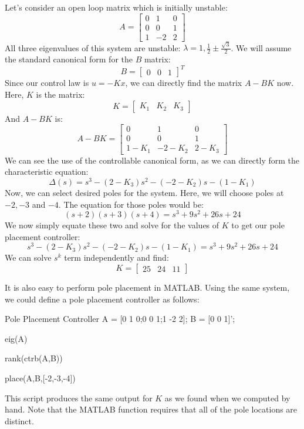 \newpage
\begin{example}
Let's consider an open loop matrix which is initially unstable:
$$A=\begin{bmatrix}
0&1&0   \\0&0&1\\1&-2&2
\end{bmatrix}$$
All three eigenvalues of this system are unstable: $\lambda=1,\frac{1}{2}\pm\frac{\sqrt 3}{2}$. We will assume the standard canonical form for the $B$ matrix:
$$B=\begin{bmatrix}
    0&0&1
\end{bmatrix}^T$$
Since our control law is $u=-Kx$, we can directly find the matrix $A-BK$ now. Here, $K$ is the matrix:
$$K=\begin{bmatrix}
    K_1&K_2&K_3
\end{bmatrix}$$
And $A-BK$ is:
$$A-BK=\begin{bmatrix}
    0&1&0\\0&0&1\\1-K_1&-2-K_2&2-K_3
\end{bmatrix}$$
We can see the use of the controllable canonical form, as we can directly form the characteristic equation:
$$\Delta(s)=s^3-(2-K_3)s^2-(-2-K_2)s-(1-K_1)$$
Now, we can select desired poles for the system. Here, we will choose poles at $-2,-3$ and $-4$. The equation for those poles would be:
$$(s+2)(s+3)(s+4)=s^3+9s^2+26s+24$$
We now simply equate these two and solve for the values of $K$ to get our pole placement controller:
$$s^3-(2-K_3)s^2-(-2-K_2)s-(1-K_1)=s^3+9s^2+26s+24$$
We can solve $s^k$ term independently and find:
$$K=\begin{bmatrix}
    25&24&11
\end{bmatrix}$$
\end{example}
It is also easy to perform pole placement in MATLAB. Using the same system, we could define a pole placement controller as follows:
\begin{matlabscript}{Pole Placement Controller}
A = [0 1 0;0 0 1;1 -2 2];
B = [0 0 1]';

eig(A)

rank(ctrb(A,B))

place(A,B,[-2,-3,-4])
\end{matlabscript}
This script produces the same output for $K$ as we found when we computed by hand. Note that the MATLAB function requires that all of the pole locations are distinct.



